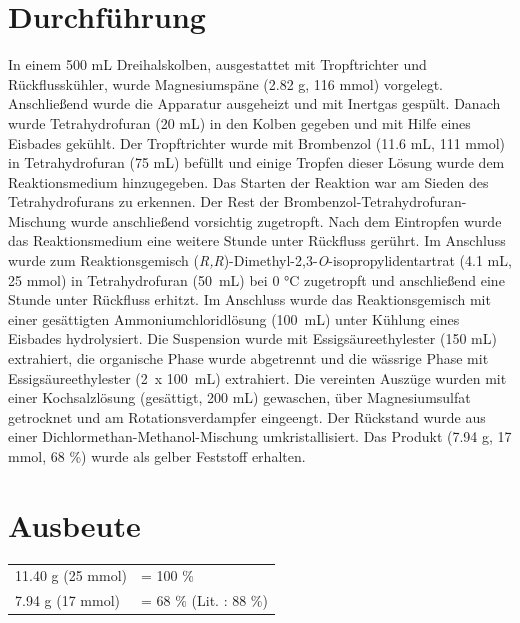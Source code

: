\documentclass[12pt]{article}
\begin{document}
\begin{onehalfspace}
\normalsize \section{Durchführung \cite{vor}}
In einem 500 \si{\milli\liter} Dreihalskolben, ausgestattet mit Tropftrichter und Rückflusskühler, wurde  Magnesiumspäne (2.82 \si{\gram}, 116 \si{\milli\mol}) vorgelegt. Anschließend wurde die Apparatur ausgeheizt und mit Inertgas gespült. Danach wurde Tetrahydrofuran (20 \si{\milli\liter}) in den Kolben gegeben und mit Hilfe eines Eisbades gekühlt.
 Der Tropftrichter wurde mit Brombenzol (11.6 \si{\milli\liter}, 111 \si{\milli\mol}) in Tetrahydrofuran (75 \si{\milli\liter}) befüllt und einige Tropfen dieser Lösung wurde
  dem Reaktionsmedium hinzugegeben. Das Starten der Reaktion war am Sieden des Tetrahydrofurans zu erkennen.
 Der Rest der Brombenzol-Tetrahydrofuran-Mischung wurde anschließend vorsichtig zugetropft.
 Nach dem Eintropfen wurde das Reaktionsmedium eine weitere Stunde unter Rückfluss
 gerührt. Im Anschluss wurde zum Reaktionsgemisch (\textit{R,R})-Dimethyl-2,3-\textit{O}-isopropylidentartrat (4.1 \si{\milli\liter}, 25 \si{\milli\mol}) in Tetrahydrofuran (50~\si{\milli\liter}) bei 0 \si{\celsius} zugetropft und anschließend eine Stunde unter Rückfluss erhitzt.
Im Anschluss wurde das Reaktionsgemisch mit einer gesättigten Ammoniumchloridlösung (100~\si{\milli\liter}) unter Kühlung eines Eisbades hydrolysiert.
Die Suspension wurde mit Essigsäureethylester (150 \si{\milli\liter}) extrahiert, die organische Phase wurde abgetrennt und
die wässrige Phase mit Essigsäureethylester (2~x 100~\si{\milli\liter}) extrahiert.
Die vereinten Auszüge wurden mit einer Kochsalzlösung (gesättigt, 200 \si{\milli\liter}) gewaschen,
über Magnesiumsulfat getrocknet und am Rotationsverdampfer eingeengt. Der Rückstand wurde aus einer Dichlormethan-Methanol-Mischung umkristallisiert.
Das Produkt (7.94 \si{\gram}, 17 \si{\milli\mol}, 68 \%) wurde als gelber Feststoff erhalten.


\section{Ausbeute}
\begin{tabular}{ ll}
  11.40 \si{\gram} (25 \si{\milli\mol})   & = 100 \%\\
   7.94 \si{\gram} (17 \si{\milli\mol})    & = 68 \% (Lit.\cite{vor} : 88 \%) \\
 \end{tabular}



\end{onehalfspace}
\end{document}
